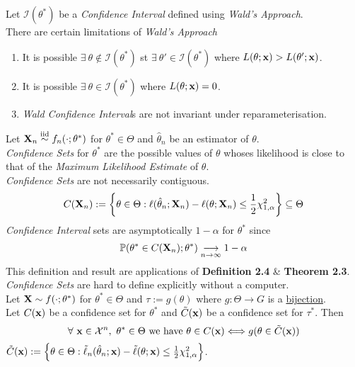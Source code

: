 \documentclass[11pt,a4paper]{article}
\begin{document}
Let $\mathcal{I}(\theta^*)$ be a \textit{Confidence Interval} defined using \textit{Wald's Approach}.\\
There are certain limitations of \textit{Wald's Approach}
\begin{enumerate}
	\item It is possible $\exists\ \theta\not\in\mathcal{I}(\theta^*)$ st $\exists\ \theta'\in\mathcal{I}(\theta^*)$ where $L(\theta;\textbf{x})>L(\theta';\textbf{x})$.
	\item It is possible $\exists\ \theta\in\mathcal{I}(\theta^*)$ where $L(\theta;\textbf{x})=0$.
	\item \textit{Wald Confidence Interval}s are not invariant under reparameterisation.
\end{enumerate}

Let $\textbf{X}_n\overset{\text{iid}}{\sim} f_n(\cdot;\theta^*)$ for $\theta^*\in\Theta$ and $\hat\theta_n$ be an estimator of $\theta$.\\
\textit{Confidence Sets} for $\theta^*$ are the possible values of $\theta$ whoses likelihood is close to that of the \textit{Maximum Likelihood Estimate} of $\theta$.\\
\textit{Confidence Sets} are not necessarily contiguous.
$$C(\textbf{X}_n):=\left\{\theta\in\Theta:\ell(\hat\theta_n;\textbf{X}_n)-\ell(\theta;\textbf{X}_n)\leq\frac{1}{2}\chi^2_{1,\alpha}\right\}\subseteq\Theta$$
\textit{Confidence Interval} sets are asymptotically $1-\alpha$ for $\theta^*$ since
$$\mathbb{P}(\theta^*\in C(\textbf{X}_n);\theta^*)\underset{n\to\infty}{\longrightarrow}1-\alpha$$
\nb This definition and result are applications of \textbf{Definition 2.4} \& \textbf{Theorem 2.3}.\\
\nb \textit{Confidence Sets} are hard to define explicitly without a computer.\\

Let $\textbf{X}\sim f(\cdot;\theta^*)$ for $\theta^*\in\Theta$ and $\tau:=g(\theta)$  where $g:\Theta\to G$ is a \underline{bijection}.\\
Let $C(\textbf{x})$ be a confidence set for $\theta^*$ and $\tilde{C}(\textbf{x})$ be a confidence set for $\tau^*$. Then
$$\forall\ \x\in\mathcal{X}^n,\ \theta^*\in\Theta\text{ we have }\theta\in C(\x)\Longleftrightarrow g(\theta\in\tilde{C}(\x))$$
\nb $\tilde{C}(\textbf{x}):=\left\{\theta\in\Theta:\tilde\ell_n(\hat\theta_n;\textbf{x})-\tilde\ell(\theta;\textbf{x})\leq\frac{1}{2}\chi^2_{1,\alpha}\right\}$.\\
\end{document}
